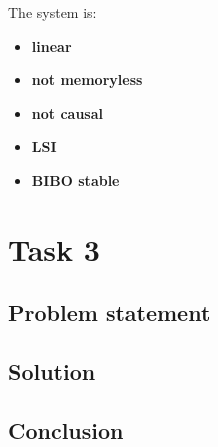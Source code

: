 \documentclass[a4paper]{article}
\theoremstyle{break}
\theoremstyle{break}
\begin{document}
The system is:

\begin{itemize}
  \item \textbf{linear}
  \item \textbf{not memoryless}
  \item \textbf{not causal}
  \item \textbf{LSI}
  \item \textbf{BIBO stable}
\end{itemize}

\section*{Task 3}

\subsection*{Problem statement}

\subsection*{Solution}

\subsection*{Conclusion}
\end{document}
